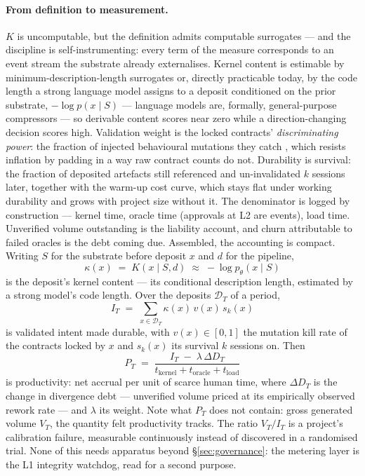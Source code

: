 \documentclass[11pt,a4paper,twocolumn]{article}
\begin{document}
\paragraph{From definition to measurement.} $K$ is uncomputable,
but the definition admits computable surrogates --- and the
discipline is self-instrumenting: every term of the measure
corresponds to an event stream the substrate already
externalises. Kernel content is estimable by
minimum-description-length surrogates \citep{rissanen1978} or,
directly practicable today, by the code length a strong language
model assigns to a deposit conditioned on the prior substrate,
$-\log p(x \mid S)$ --- language models are, formally,
general-purpose compressors \citep{deletang2023lmic} --- so
derivable content scores near zero while a direction-changing
decision scores high. Validation weight is the locked contracts'
\emph{discriminating power}: the fraction of injected behavioural
mutations they catch \citep{endres2024postconditions}, which
resists inflation by padding in a way raw contract counts do not.
Durability is survival: the fraction of deposited artefacts still
referenced and un-invalidated $k$ sessions later, together with
the warm-up cost curve, which stays flat under working durability
and grows with project size without it. The denominator is logged
by construction --- kernel time, oracle time (approvals at L2 are
events), load time. Unverified volume outstanding is the
liability account, and churn attributable to failed oracles is
the debt coming due. Assembled, the accounting is compact.
Writing $S$ for the substrate before deposit $x$ and $d$ for the
pipeline,
\[
\kappa(x) \;=\; K(x \mid S, d) \;\approx\; -\log p_{\theta}(x \mid S)
\]
is the deposit's kernel content --- its conditional description
length, estimated by a strong model's code length. Over the
deposits $\mathcal{D}_T$ of a period,
\[
I_T \;=\; \sum_{x \in \mathcal{D}_T} \kappa(x)\, v(x)\, s_k(x)
\]
is validated intent made durable, with $v(x) \in [0,1]$ the
mutation kill rate of the contracts locked by $x$ and
$s_k(x)$ its survival $k$ sessions on. Then
\[
P_T \;=\; \frac{I_T \;-\; \lambda\, \Delta D_T}
               {t_{\mathrm{kernel}} + t_{\mathrm{oracle}} + t_{\mathrm{load}}}
\]
is productivity: net accrual per unit of scarce human time, where
$\Delta D_T$ is the change in divergence debt --- unverified
volume priced at its empirically observed rework rate --- and
$\lambda$ its weight. Note what $P_T$ does not contain: gross
generated volume $V_T$, the quantity felt productivity tracks.
The ratio $V_T / I_T$ is a project's calibration failure,
measurable continuously instead of discovered in a randomised
trial. None of this needs apparatus beyond
\S\ref{sec:governance}: the metering layer is the L1 integrity
watchdog, read for a second purpose.
\end{document}
